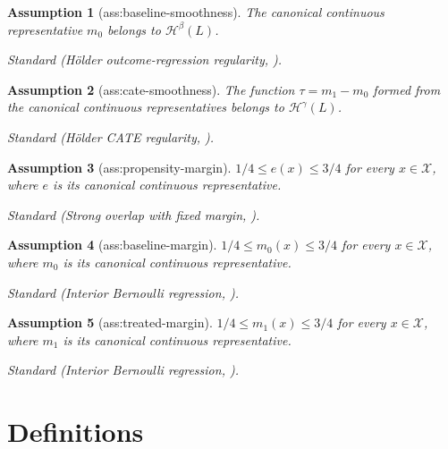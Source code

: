\documentclass{article}
\newtheorem{assumption}{Assumption}
\begin{document}
\begin{assumption}[ass:baseline-smoothness]\label{ass:baseline-smoothness}
The canonical continuous representative \(m_0\) belongs to \(\mathcal H^{\beta}(L)\).
\par\smallskip\noindent\emph{Standard} (Hölder outcome-regression regularity, \cite{KennedyBalakrishnanRobinsWasserman2024}).
\end{assumption}

\begin{assumption}[ass:cate-smoothness]\label{ass:cate-smoothness}
The function \(\tau=m_1-m_0\) formed from the canonical continuous representatives belongs to \(\mathcal H^{\gamma}(L)\).
\par\smallskip\noindent\emph{Standard} (Hölder CATE regularity, \cite{KennedyBalakrishnanRobinsWasserman2024}).
\end{assumption}

\begin{assumption}[ass:propensity-margin]\label{ass:propensity-margin}
\(1/4\le e(x)\le3/4\) for every \(x\in\mathcal X\), where \(e\) is its canonical continuous representative.
\par\smallskip\noindent\emph{Standard} (Strong overlap with fixed margin, \cite{KennedyBalakrishnanRobinsWasserman2024}).
\end{assumption}

\begin{assumption}[ass:baseline-margin]\label{ass:baseline-margin}
\(1/4\le m_0(x)\le3/4\) for every \(x\in\mathcal X\), where \(m_0\) is its canonical continuous representative.
\par\smallskip\noindent\emph{Standard} (Interior Bernoulli regression, \cite{KennedyBalakrishnanRobinsWasserman2024}).
\end{assumption}

\begin{assumption}[ass:treated-margin]\label{ass:treated-margin}
\(1/4\le m_1(x)\le3/4\) for every \(x\in\mathcal X\), where \(m_1\) is its canonical continuous representative.
\par\smallskip\noindent\emph{Standard} (Interior Bernoulli regression, \cite{KennedyBalakrishnanRobinsWasserman2024}).
\end{assumption}

\section{Definitions}
\end{document}
